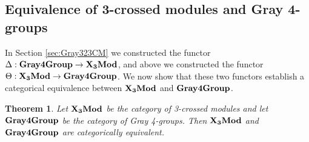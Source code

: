 \documentclass[11pt, reqno]{amsart} %
\newcommand{\TXMod}{{\bf X_3Mod}}
\newcommand{\Gray}{{\bf Gray4Group}}
\newtheorem{theorem}{Theorem}[section]
\theoremstyle{definition}
\theoremstyle{remark}
\numberwithin{equation}{section}
\begin{document}
\subsection{Equivalence of 3-crossed modules and Gray 4-groups}\label{sec:thm}

In Section \ref{sec:Gray323CM} we constructed the functor $\Delta: \Gray \rightarrow \TXMod $, and above we constructed the functor $\Theta : \TXMod \rightarrow \Gray$. We now show that these two functors establish a categorical equivalence between $\TXMod$ and $ \Gray$.

\begin{theorem}
  \label{thm:equivalence_3cm_gray4group}
Let $\TXMod$ be the category of 3-crossed modules and let $ \Gray$ be the category of Gray 4-groups. Then $\TXMod$ and $ \Gray$ are categorically equivalent.
\end{theorem}
\end{document}
